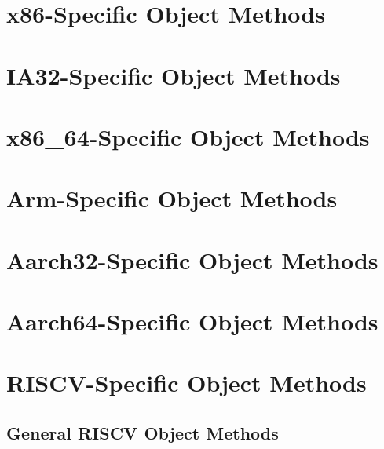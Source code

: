 \clearpage

\section{x86-Specific Object Methods}
\clearpage

\section{IA32-Specific Object Methods}
\clearpage

\section{x86\_64-Specific Object Methods}

\fi

\clearpage

\section{Arm-Specific Object Methods}

\clearpage

\section{Aarch32-Specific Object Methods}
\clearpage

\section{Aarch64-Specific Object Methods}
\clearpage

\section{RISCV-Specific Object Methods}
\subsection{General RISCV Object Methods}
